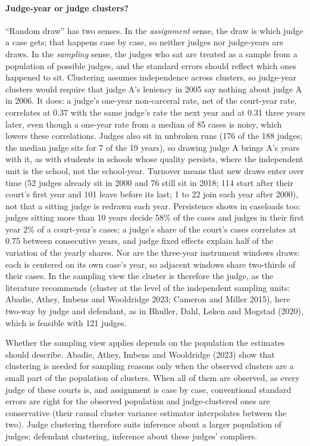 \documentclass[11pt]{article}
\begin{document}
\paragraph{Judge-year or judge clusters?} ``Random draw'' has two senses. In the \emph{assignment} sense, the draw is which judge a case gets; that happens case by case, so neither judges nor judge-years are draws. In the \emph{sampling} sense, the judges who sat are treated as a sample from a population of possible judges, and the standard errors should reflect which ones happened to sit. Clustering assumes independence across clusters, so judge-year clusters would require that judge A's leniency in 2005 say nothing about judge A in 2006. It does: a judge's one-year non-carceral rate, net of the court-year rate, correlates at 0.37 with the same judge's rate the next year and at 0.31 three years later, even though a one-year rate from a median of 85 cases is noisy, which lowers these correlations. Judges also sit in unbroken runs (176 of the 188 judges; the median judge sits for 7 of the 19 years), so drawing judge A brings A's years with it, as with students in schools whose quality persists, where the independent unit is the school, not the school-year. Turnover means that new draws enter over time (52 judges already sit in 2000 and 76 still sit in 2018; 114 start after their court's first year and 101 leave before its last; 1 to 22 join each year after 2000), not that a sitting judge is redrawn each year. Persistence shows in caseloads too: judges sitting more than 10 years decide 58\% of the cases and judges in their first year 2\% of a court-year's cases; a judge's share of the court's cases correlates at 0.75 between consecutive years, and judge fixed effects explain half of the variation of the yearly shares. Nor are the three-year instrument windows draws: each is centered on its own case's year, so adjacent windows share two-thirds of their cases. In the sampling view the cluster is therefore the judge, as the literature recommends (cluster at the level of the independent sampling units: Abadie, Athey, Imbens and Wooldridge 2023; Cameron and Miller 2015), here two-way by judge and defendant, as in Bhuller, Dahl, Løken and Mogstad (2020), which is feasible with 121 judges.

Whether the sampling view applies depends on the population the estimates should describe. Abadie, Athey, Imbens and Wooldridge (2023) show that clustering is needed for sampling reasons only when the observed clusters are a small part of the population of clusters. When all of them are observed, as every judge of these courts is, and assignment is case by case, conventional standard errors are right for the observed population and judge-clustered ones are conservative (their causal cluster variance estimator interpolates between the two). Judge clustering therefore suits inference about a larger population of judges; defendant clustering, inference about these judges' compliers.
\end{document}
